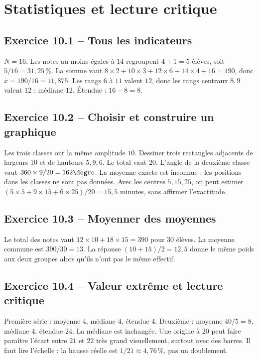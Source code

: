 \chapter{Statistiques et lecture critique}
\label{corriges:10}
\section*{Exercice 10.1 -- Tous les indicateurs}
$N=16$. Les notes au moins égales à $14$ regroupent $4+1=5$ élèves, soit $5/16=31{,}25\,\%$.
La somme vaut $8\times2+10\times3+12\times6+14\times4+16=190$, donc $\bar x=190/16=11{,}875$.
Les rangs $6$ à $11$ valent $12$, donc les rangs centraux $8,9$ valent $12$ : médiane $12$.
Étendue : $16-8=8$.

\section*{Exercice 10.2 -- Choisir et construire un graphique}
Les trois classes ont la même amplitude $10$. Dessiner trois rectangles adjacents de largeurs $10$ et de hauteurs $5,9,6$. Le total vaut $20$. L'angle de la deuxième classe vaut $360\times9/20=162\degre$.
La moyenne exacte est inconnue : les positions dans les classes ne sont pas données. Avec les centres $5,15,25$, on peut estimer $(5\times5+9\times15+6\times25)/20=15{,}5$ minutes, sans affirmer l'exactitude.

\section*{Exercice 10.3 -- Moyenner des moyennes}
Le total des notes vaut $12\times10+18\times15=390$ pour $30$ élèves. La moyenne commune est $390/30=13$. La réponse $(10+15)/2=12{,}5$ donne le même poids aux deux groupes alors qu'ils n'ont pas le même effectif.

\section*{Exercice 10.4 -- Valeur extrême et lecture critique}
Première série : moyenne $4$, médiane $4$, étendue $4$.
Deuxième : moyenne $40/5=8$, médiane $4$, étendue $24$.
La médiane est inchangée. Une origine à $20$ peut faire paraître l'écart entre $21$ et $22$ très grand visuellement, surtout avec des barres. Il faut lire l'échelle : la hausse réelle est $1/21\approx4{,}76\,\%$, pas un doublement.
